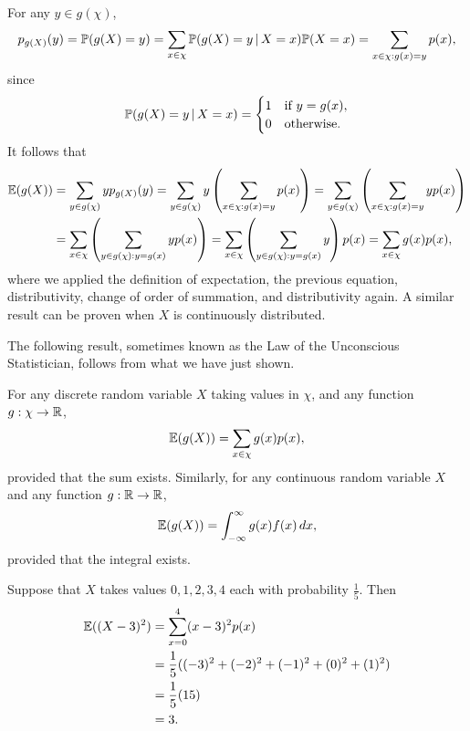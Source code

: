 \documentclass[10pt, a4paper]{article}
\begin{document}
For any $y \in g(\chi)$,
\[
p_{g(X)}(y) = \P(g(X) = y) = \sum_{x \in \chi}\P(g(X) = y\,|\,X = x)\P(X = x) = \sum_{x \in \chi:g(x) = y}p(x),
\]
since
\[
\P(g(X) = y\,|\,X = x) = \begin{cases}
    1 &\text{if } y = g(x), \\
    0 &\text{otherwise}.
\end{cases}
\]
It follows that
\begin{align*}
    \E(g(X)) &= \sum_{y \in g(\chi)}yp_{g(X)}(y)
    = \sum_{y \in g(\chi)}y\left(\sum_{x \in \chi: g(x) = y}p(x)\right)
    = \sum_{y \in g(\chi)}\left(\sum_{x \in \chi : g(x) = y}yp(x)\right) \\
    &= \sum_{x \in \chi}\left(\sum_{y \in g(\chi) : y = g(x)}yp(x)\right)
    = \sum_{x \in \chi}\left(\sum_{y \in g(\chi) : y = g(x)}y\right)p(x)
    = \sum_{x \in \chi}g(x)p(x),
\end{align*}
where we applied the definition of expectation,
the previous equation,
distributivity, change of order of summation, and distributivity again.
A similar result can be proven when $X$ is continuously distributed.

The following result, sometimes known as the Law of the Unconscious Statistician, follows from what we have just shown.
\begin{theorem}\label{pre_prob_thm_lawofunconsciousstatistician}
    For any discrete random variable $X$ taking values in $\chi$,
    and any function $g : \chi \rightarrow \R$,
    \begin{equation}
        \E(g(X)) = \sum_{x \in \chi}g(x)p(x),
    \end{equation}
    provided that the sum exists.
    Similarly,
    for any continuous random variable $X$ and any function $g : \R \rightarrow \R$,
    \begin{equation}
        \E(g(X)) = \int_{-\infty}^{\infty}g(x)f(x)\,dx,
    \end{equation}
    provided that the integral exists.
\end{theorem}

\begin{example}
    Suppose that $X$ takes values $0, 1, 2, 3, 4$ each with probability $\frac{1}{5}$.
    Then
    \begin{align*}
        \E((X - 3) ^ 2) &= \sum_{x = 0}^{4}(x - 3) ^ 2p(x) \\
        &= \frac{1}{5}((-3) ^ 2 + (-2) ^ 2 + (-1) ^ 2 + (0) ^ 2 + (1) ^ 2) \\
        &= \frac{1}{5}(15) \\
        &= 3.
    \end{align*}
\end{example}
\end{document}
